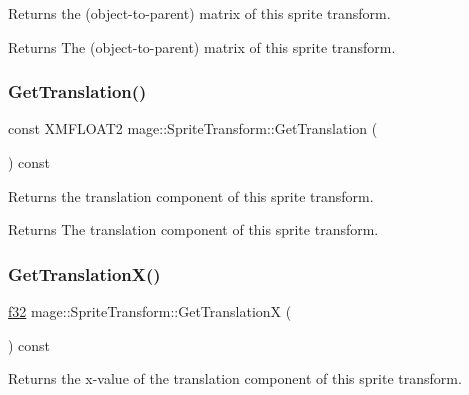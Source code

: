 Returns the (object-\/to-\/parent) matrix of this sprite transform.

\begin{DoxyReturn}{Returns}
The (object-\/to-\/parent) matrix of this sprite transform. 
\end{DoxyReturn}
\hypertarget{structmage_1_1_sprite_transform_ae8103fdc37f52d294d3703709949a30c}{}\label{structmage_1_1_sprite_transform_ae8103fdc37f52d294d3703709949a30c} 
\subsubsection{\texorpdfstring{Get\+Translation()}{GetTranslation()}}
{\footnotesize\ttfamily const X\+M\+F\+L\+O\+A\+T2 mage\+::\+Sprite\+Transform\+::\+Get\+Translation (\begin{DoxyParamCaption}{ }\end{DoxyParamCaption}) const\hspace{0.3cm}{\ttfamily [noexcept]}}

Returns the translation component of this sprite transform.

\begin{DoxyReturn}{Returns}
The translation component of this sprite transform. 
\end{DoxyReturn}
\hypertarget{structmage_1_1_sprite_transform_ad119ea224d5862f886c1e50d4f733fc5}{}\label{structmage_1_1_sprite_transform_ad119ea224d5862f886c1e50d4f733fc5} 
\subsubsection{\texorpdfstring{Get\+Translation\+X()}{GetTranslationX()}}
{\footnotesize\ttfamily \hyperlink{namespacemage_a6a44ad388483959dc4dff9f2aef91431}{f32} mage\+::\+Sprite\+Transform\+::\+Get\+TranslationX (\begin{DoxyParamCaption}{ }\end{DoxyParamCaption}) const\hspace{0.3cm}{\ttfamily [noexcept]}}

Returns the x-\/value of the translation component of this sprite transform.

